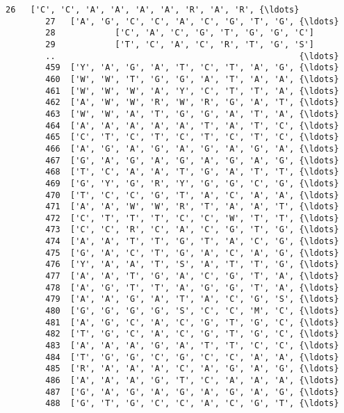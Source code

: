 \documentclass[11pt]{article}
\begin{document}
\begin{Verbatim}[commandchars=\\\{\}]
        26   ['C', 'C', 'A', 'A', 'A', 'A', 'R', 'A', 'R', {\ldots}   
        27   ['A', 'G', 'C', 'C', 'A', 'C', 'G', 'T', 'G', {\ldots}   
        28            ['C', 'A', 'C', 'G', 'T', 'G', 'G', 'C']   
        29            ['T', 'C', 'A', 'C', 'R', 'T', 'G', 'S']   
        ..                                                 {\ldots}   
        459  ['Y', 'A', 'G', 'A', 'T', 'C', 'T', 'A', 'G', {\ldots}   
        460  ['W', 'W', 'T', 'G', 'G', 'A', 'T', 'A', 'A', {\ldots}   
        461  ['W', 'W', 'W', 'A', 'Y', 'C', 'T', 'T', 'A', {\ldots}   
        462  ['A', 'W', 'W', 'R', 'W', 'R', 'G', 'A', 'T', {\ldots}   
        463  ['W', 'W', 'A', 'T', 'G', 'G', 'A', 'T', 'A', {\ldots}   
        464  ['A', 'A', 'A', 'A', 'A', 'T', 'A', 'T', 'C', {\ldots}   
        465  ['C', 'T', 'C', 'T', 'C', 'T', 'C', 'T', 'C', {\ldots}   
        466  ['A', 'G', 'A', 'G', 'A', 'G', 'A', 'G', 'A', {\ldots}   
        467  ['G', 'A', 'G', 'A', 'G', 'A', 'G', 'A', 'G', {\ldots}   
        468  ['T', 'C', 'A', 'A', 'T', 'G', 'A', 'T', 'T', {\ldots}   
        469  ['G', 'Y', 'G', 'R', 'Y', 'G', 'G', 'C', 'G', {\ldots}   
        470  ['T', 'C', 'C', 'G', 'T', 'A', 'C', 'A', 'A', {\ldots}   
        471  ['A', 'A', 'W', 'W', 'R', 'T', 'A', 'A', 'T', {\ldots}   
        472  ['C', 'T', 'T', 'T', 'C', 'C', 'W', 'T', 'T', {\ldots}   
        473  ['C', 'C', 'R', 'C', 'A', 'C', 'G', 'T', 'G', {\ldots}   
        474  ['A', 'A', 'T', 'T', 'G', 'T', 'A', 'C', 'G', {\ldots}   
        475  ['G', 'A', 'C', 'T', 'G', 'A', 'C', 'A', 'G', {\ldots}   
        476  ['Y', 'A', 'A', 'T', 'S', 'A', 'T', 'T', 'G', {\ldots}   
        477  ['A', 'A', 'T', 'G', 'A', 'C', 'G', 'T', 'A', {\ldots}   
        478  ['A', 'G', 'T', 'T', 'A', 'G', 'G', 'T', 'A', {\ldots}   
        479  ['A', 'A', 'G', 'A', 'T', 'A', 'C', 'G', 'S', {\ldots}   
        480  ['G', 'G', 'G', 'G', 'S', 'C', 'C', 'M', 'C', {\ldots}   
        481  ['A', 'G', 'C', 'A', 'C', 'G', 'T', 'G', 'C', {\ldots}   
        482  ['T', 'G', 'C', 'A', 'C', 'G', 'T', 'G', 'C', {\ldots}   
        483  ['A', 'A', 'A', 'G', 'A', 'T', 'T', 'C', 'C', {\ldots}   
        484  ['T', 'G', 'G', 'C', 'G', 'C', 'C', 'A', 'A', {\ldots}   
        485  ['R', 'A', 'A', 'A', 'C', 'A', 'G', 'A', 'G', {\ldots}   
        486  ['A', 'A', 'A', 'G', 'T', 'C', 'A', 'A', 'A', {\ldots}   
        487  ['G', 'A', 'G', 'A', 'G', 'A', 'G', 'A', 'G', {\ldots}   
        488  ['G', 'T', 'G', 'C', 'C', 'A', 'C', 'G', 'T', {\ldots}   
        

\end{Verbatim}
\end{document}
